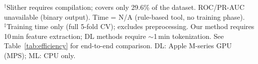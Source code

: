 \begin{table}[t]
{\footnotesize $^\dagger$Slither requires compilation; covers only 29.6\% of the dataset. ROC/PR-AUC unavailable (binary output). Time = N/A (rule-based tool, no training phase).}\\
{\footnotesize $^\ddagger$Training time only (full 5-fold CV); excludes preprocessing. Our method requires 10\,min feature extraction; DL methods require ${\sim}$1\,min tokenization. See Table~\ref{tab:efficiency} for end-to-end comparison. DL: Apple M-series GPU (MPS); ML: CPU only.}
\end{table}
